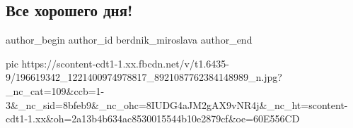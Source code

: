  
 
 
 
 
 
\subsection{Все хорошего дня!}
\label{sec:07_06_2021.fb.berdnik_miroslava.2.foto_hram_solnce}
\ifcmt
 author_begin
   author_id berdnik_miroslava
 author_end
\fi

\ifcmt
  pic https://scontent-cdt1-1.xx.fbcdn.net/v/t1.6435-9/196619342_1221400974978817_8921087762384148989_n.jpg?_nc_cat=109&ccb=1-3&_nc_sid=8bfeb9&_nc_ohc=8IUDG4aJM2gAX9vNR4j&_nc_ht=scontent-cdt1-1.xx&oh=2a13b4b634ac8530015544b10e2879cf&oe=60E556CD
\fi
